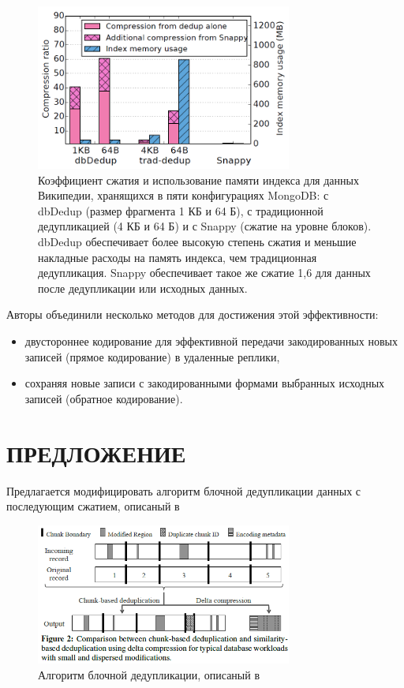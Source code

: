 \documentclass[12pt,a4paper]{article}
\begin{document}
\begin{figure}[h]
\includegraphics[width=0.75\textwidth]{img1_xu17}
\caption{\label{img1_xu17} Коэффициент сжатия и использование памяти индекса для данных Википедии,
хранящихся в пяти конфигурациях MongoDB: с dbDedup (размер фрагмента 1 КБ и 64 Б), с традиционной дедупликацией (4 КБ и 64 Б) и с Snappy (сжатие на уровне блоков). dbDedup обеспечивает более высокую степень сжатия и меньшие накладные расходы на память индекса, чем традиционная дедупликация. Snappy обеспечивает такое же сжатие 1,6 для данных после дедупликации или исходных данных. \cite{Xu17}}
\centering
\end{figure}

Авторы объединили несколько методов для достижения этой эффективности:
\begin{itemize}
    \item двустороннее кодирование для эффективной передачи закодированных новых записей (прямое кодирование) в удаленные реплики,
    \item сохраняя новые записи с закодированными формами выбранных исходных записей (обратное кодирование).
\end{itemize}

\section{ПРЕДЛОЖЕНИЕ}
Предлагается модифицировать алгоритм блочной дедупликации данных с последующим сжатием, описаный в \cite{Xu17}
\begin{figure}[h]
\includegraphics[width=0.75\textwidth]{alg_xu17}
\caption{\label{alg_xu17} Алгоритм блочной дедупликации, описаный в \cite{Xu17}}
\centering
\end{figure}
\end{document}
